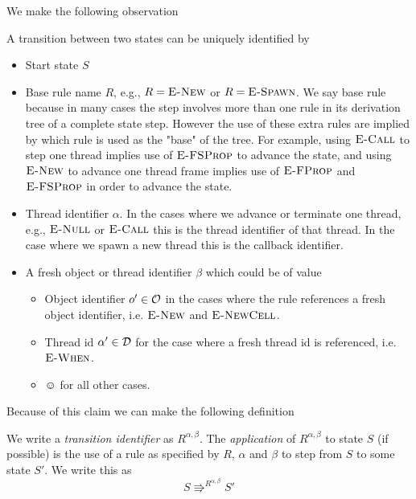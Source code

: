 We make the following observation
\begin{claim}
  A transition between two states can be uniquely identified by
  \begin{itemize}
    \item Start state $S$
    \item Base rule name $R$, e.g., $R = \mbox{{\sc E-New}}$ or $R = \mbox{\sc E-Spawn}$. We say base rule
      because in many cases the step involves more than one rule in its
      derivation tree of a complete state step. However the use of these extra
      rules are implied by which rule is used as the "base" of the tree. For
      example, using $\mbox{\sc E-Call}$ to step one thread implies use of $\mbox{\sc E-FSProp}$ to
      advance the state, and using $\mbox{{\sc E-New}}$ to advance one thread frame implies
      use of $\mbox{\sc E-FProp}$ and $\mbox{\sc E-FSProp}$ in order to advance the state.
    \item Thread identifier $\alpha$. In the cases where we advance or terminate
      one thread, e.g., $\mbox{{\sc E-Null}}$ or $\mbox{\sc E-Call}$ this is the thread identifier of that
      thread. In the case where we spawn a new thread this is the callback
      identifier.
    \item A fresh object or thread identifier $\beta$ which could be of value
      \begin{itemize}
        \item Object identifier $o' \in \mathcal{O}$ in the cases where the rule
          references a fresh object identifier, i.e. $\mbox{{\sc E-New}}$ and $\mbox{{\sc E-NewCell}}$.
        \item Thread id $\alpha' \in \mathcal{D}$ for the case where a fresh thread id is
          referenced, i.e. $\mbox{{\sc E-When}}$.
        \item $\smiley$ for all other cases.
      \end{itemize}
  \end{itemize}
\end{claim}

Because of this claim we can make the following definition

\begin{definition} \label{def:trans_id}
  We write a \emph{transition identifier} as $R^{\alpha, \beta}$. The
  \emph{application} of $R^{\alpha, \beta}$ to state $S$ (if possible) is the
  use of a rule as specified by $R$, $\alpha$ and $\beta$ to step from $S$ to
  some state $S'$. We write this as
  \begin{equation*}
    S \Rrightarrow^{R^{\alpha, \beta}} S'
  \end{equation*}
\end{definition}

